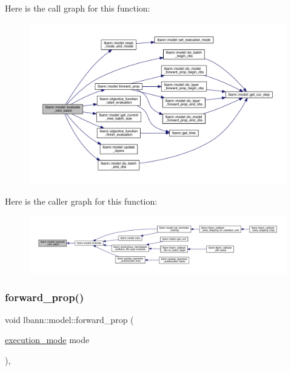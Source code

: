 Here is the call graph for this function\+:\nopagebreak
\begin{figure}[H]
\begin{center}
\leavevmode
\includegraphics[width=350pt]{classlbann_1_1model_a9716a956bdc7d20dbc8ce8bf08bbcea7_cgraph}
\end{center}
\end{figure}
Here is the caller graph for this function\+:\nopagebreak
\begin{figure}[H]
\begin{center}
\leavevmode
\includegraphics[width=350pt]{classlbann_1_1model_a9716a956bdc7d20dbc8ce8bf08bbcea7_icgraph}
\end{center}
\end{figure}
\mbox{\label{classlbann_1_1model_adc4f845c8e292afe2d8686f459729484}} 
\subsubsection{\texorpdfstring{forward\+\_\+prop()}{forward\_prop()}}
{\footnotesize\ttfamily void lbann\+::model\+::forward\+\_\+prop (\begin{DoxyParamCaption}\item[{\hyperlink{base_8hpp_a2781a159088df64ed7d47cc91c4dc0a8}{execution\+\_\+mode}}]{mode }\end{DoxyParamCaption})\hspace{0.3cm}{\ttfamily [protected]}, {\ttfamily [virtual]}}

